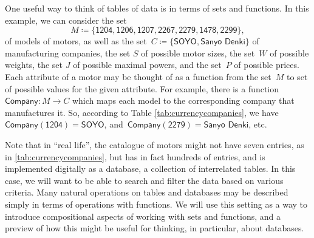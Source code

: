 \begin{comment}
\begin{table}[h]
    \centering
    \begin{tabular}{c|c|c|c|c|c}
         Motor ID & Company& Size & \unit[Weight]{[g]} & \unit[Max Power]{[W]} & \unit[price]{[USD]} \\
         \hline
         $\textsf{Model1}$&Company $\textsf{B}$ & 2 x 3 x 4& 10 & &259\\
         $\textsf{Model2}$&Company $\textsf{A}$ &2 x 3 x 4& 20 & &109\\
         $\textsf{Model3}$&Company $\textsf{B}$ &2 x 3 x 4& 5 & &124\\
         $\textsf{Model4}$&Company $\textsf{C}$ &2 x 3 x 4& 30 & &399\\
         $\textsf{Model5}$&Company $\textsf{A}$ &2 x 3 x 4& 45 & &245  \\
        $\textsf{Model6}$&Company $\textsf{D}$ & 2 x 3 x 4& 20 & &89\\
        $\textsf{Model7}$&Company $\textsf{B}$ & 2 x 3 x 4& 15 &&130
    \end{tabular}
    \caption{A simplified catalogue of motors.}
    \label{tab:currencycompanies}
\end{table}
\end{comment}
One useful way to think of tables of data is in terms of sets and functions. In this example, we can consider the set
\begin{equation*}
M \coloneqq \{ \textsf{1204}, \textsf{1206}, \textsf{1207}, \textsf{2267}, \textsf{2279}, \textsf{1478}, \textsf{2299} \},
\end{equation*}
of models of motors, as well as the set~$C \coloneqq \{ \textsf{SOYO}, \textsf{Sanyo Denki}\}$ of manufacturing companies, the set $S$ of possible motor sizes, the set~$W$ of possible weights, the set $J$ of possible maximal powers, and the set~$P$ of possible prices. Each attribute of a motor may be thought of as a function from the set~$M$ to set of possible values for the given attribute. For example, there is a function~$\textsf{Company}\colon M \to C$ which maps each model to the corresponding company that manufactures it. So, according to Table \ref{tab:currencycompanies}, we have ~$\textsf{Company}(\textsf{1204}) = \textsf{SOYO}$, and~$\textsf{Company}(\textsf{2279}) = \textsf{Sanyo Denki}$, etc.

Note that in ``real life'', the catalogue of motors might not have seven entries, as in \cref{tab:currencycompanies}, but has in fact hundreds of entries, and is implemented digitally as a database,  a collection of interrelated tables. In this case, we will want to be able to search and filter the data based on various criteria. Many natural operations on tables and databases may be described simply in terms of operations with functions. We will use this setting as a way to introduce compositional aspects of working with sets and functions, and a preview of how this might be useful for thinking, in particular, about databases.

